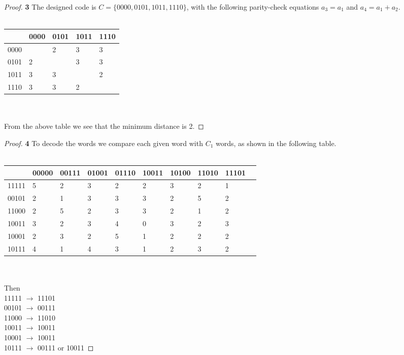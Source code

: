 \documentclass[11pt]{article}
\begin{document}
	\begin{proof}{\textbf{3}}
		The designed code is $C=\{0000,0101,1011,1110\}$, with the following parity-check equations $a_3=a_1$ and $a_4=a_1+a_2$.\\\\
		\begin{adjustbox}{max width=\textwidth,center}
		\begin{tabular}{l|llll}
			& 0000 & 0101 & 1011 & 1110 \\ \hline
			0000 &  & 2 & 3 & 3 \\
			0101 & 2 &  & 3 & 3 \\
			1011 & 3 & 3 &  & 2 \\
			1110 & 3 & 3 & 2 & \\
		\end{tabular}
		\end{adjustbox}
		\\\\From the above table we see that the minimum distance is 2.
	\end{proof}
	\begin{proof}{\textbf{4}}
	To decode the words we compare each given word with $C_1$ words, as shown in the following table.\\\\
	\begin{adjustbox}{max width=\textwidth,center}
		\begin{tabular}{l|lllllllll}
			& 00000 & 00111 & 01001 & 01110 & 10011 & 10100 & 11010 & 11101 \\ \hline
			11111 & 5 & 2 & 3 & 2 & 2 & 3 & 2 & 1 \\
			00101 & 2 & 1 & 3 & 3 & 3 & 2 & 5 & 2 \\
			11000 & 2 & 5 & 2 & 3 & 3 & 2 & 1 & 2 \\
			10011 & 3 & 2 & 3 & 4 & 0 & 3 & 2 & 3 \\
			10001 & 2 & 3 & 2 & 5 & 1 & 2 & 2 & 2 \\
			10111 & 4 & 1 & 4 & 3 & 1 & 2 & 3 & 2 \\
		\end{tabular}
		\end{adjustbox}
		\\\\ Then\\
		11111 $\rightarrow$ 11101 \\
		00101 $\rightarrow$ 00111 \\
		11000 $\rightarrow$ 11010 \\
		10011 $\rightarrow$ 10011 \\
		10001 $\rightarrow$ 10011 \\
		10111 $\rightarrow$ 00111 or 10011	
	\end{proof}
\end{document}
